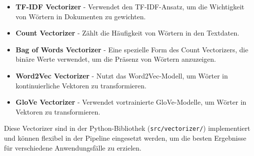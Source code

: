 \begin{itemize}
    \item \textbf{TF-IDF Vectorizer} - Verwendet den TF-IDF-Ansatz, um die Wichtigkeit von Wörtern in Dokumenten zu gewichten.
    \item \textbf{Count Vectorizer} - Zählt die Häufigkeit von Wörtern in den Textdaten.
    \item \textbf{Bag of Words Vectorizer} - Eine spezielle Form des Count Vectorizers, die binäre Werte verwendet, um die Präsenz von Wörtern anzuzeigen.
    \item \textbf{Word2Vec Vectorizer} - Nutzt das Word2Vec-Modell, um Wörter in kontinuierliche Vektoren zu transformieren.
    \item \textbf{GloVe Vectorizer} - Verwendet vortrainierte GloVe-Modelle, um Wörter in Vektoren zu transformieren.
\end{itemize}

Diese Vectorizer sind in der Python-Bibliothek (\texttt{src/vectorizer/}) implementiert und können flexibel in der Pipeline eingesetzt werden, um die besten Ergebnisse für verschiedene Anwendungsfälle zu erzielen.
